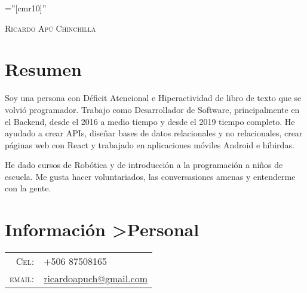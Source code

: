 \documentclass[a4paper,11pt]{article}
\begin{document}

\pagestyle{empty} %

\font\fb=''[cmr10]'' %

\par{\centering
		{\Huge   \textsc{Ricardo Apú Chinchilla}
	}\bigskip\par}

\section{Resumen}

Soy una persona con Déficit Atencional e Hiperactividad de libro de texto que se volvió programador. Trabajo como Desarrollador de Software, principalmente en el Backend, desde el 2016 a medio tiempo y desde el 2019 tiempo completo.
He ayudado a crear APIs, diseñar bases de datos relacionales y no relacionales, crear páginas web con React y trabajado en aplicaciones móviles Android e híbirdas.

He dado cursos de Robótica y de introducción a la programación a niños de escuela. Me gusta hacer voluntariados, las conversasiones amenas y entenderme con la gente.
\section{Información >Personal}

\begin{tabular}{rl}
    \textsc{Cel:}     & +506 87508165\\
    \textsc{email:}     & \href{mailto:ricardoapuch@gmail.com}{ricardoapuch@gmail.com}\\
    
\end{tabular}

\end{document}

